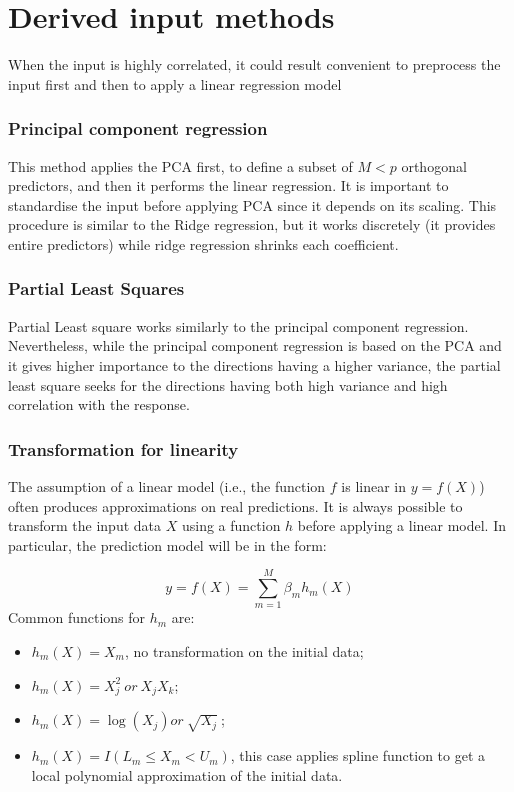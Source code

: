 \section{Derived input methods}
When the input is highly correlated, it could result convenient to preprocess the input first and then to apply a linear regression model

\subsubsection{Principal component regression}
This method applies the PCA first, to define a subset of $M<p$ orthogonal predictors, and then it performs the linear regression. It is important to standardise the input before applying PCA since it depends on its scaling. This procedure is similar to the Ridge regression, but it works discretely (it provides entire predictors) while ridge regression shrinks each coefficient.

\subsubsection{Partial Least Squares}
Partial Least square works similarly to the principal component regression. Nevertheless, while the principal component regression is based on the PCA and it gives higher importance to the directions having a higher variance, the partial least square seeks for the directions having both high variance and high correlation with the response.

\subsubsection{Transformation for linearity}
The assumption of a linear model (i.e., the function $f$ is linear in $y=f(X)$) often produces approximations on real predictions. It is always possible to transform the input data $X$ using a function $h$ before applying a linear model. In particular, the prediction model will be in the form:

\begin{equation}
y=f\left(X\right)=\sum_{m=1}^{M}{\beta_mh_m(X)}
\label{eq_transformationForLinearity}
\end{equation}
Common functions for $h_m$ are:
\begin{itemize}
    \item $h_m(X)=X_m$, no transformation on the initial data;
    \item $h_m\left(X\right)=X_j^2\ or\ X_jX_k$;
    \item $h_m\left(X\right)=\log{\left(X_j\right)}or\ \sqrt{X_j}\ $;
    \item $h_m\left(X\right)=I(L_m\le X_m<U_m)$, this case applies spline function to get a local polynomial approximation of the initial data.
\end{itemize}

